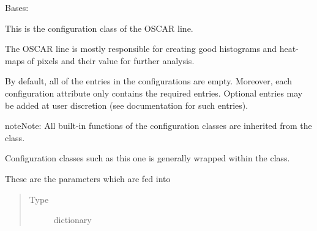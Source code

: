 \documentclass[letterpaper,10pt,english]{sphinxmanual}
\begin{document}
\begin{fulllineitems}
\label{\detokenize{python_docstrings/IfA_Smeargle.yankee.configuration_classes.OscarConfig_file:IfA_Smeargle.yankee.configuration_classes.OscarConfig_file.OscarConfig}}
Bases: {\hyperref[\detokenize{python_docstrings/IfA_Smeargle.yankee.configuration_classes.BaseConfig_file:IfA_Smeargle.yankee.configuration_classes.BaseConfig_file.BaseConfig}]{}}

This is the configuration class of the OSCAR line.

The OSCAR line is mostly responsible for creating good histograms and
heat-maps of pixels and their value for further analysis.

By default, all of the entries in the configurations are empty. Moreover,
each configuration attribute only contains the required entries. Optional
entries may be added at user discretion (see documentation for such
entries).

\begin{sphinxadmonition}{note}{Note:}
All built-in functions of the configuration classes are inherited from the
{\hyperref[\detokenize{python_docstrings/IfA_Smeargle.yankee.configuration_classes.BaseConfig_file:IfA_Smeargle.yankee.configuration_classes.BaseConfig_file.BaseConfig}]{}}
class.

Configuration classes such as this one is generally wrapped within the
{\hyperref[\detokenize{python_docstrings/IfA_Smeargle.yankee.yankee_main:IfA_Smeargle.yankee.yankee_main.SmeargleConfig}]{}} class.
\end{sphinxadmonition}

\begin{fulllineitems}
\label{\detokenize{python_docstrings/IfA_Smeargle.yankee.configuration_classes.OscarConfig_file:IfA_Smeargle.yankee.configuration_classes.OscarConfig_file.OscarConfig.heatmap_config}}
These are the parameters which are fed into
\begin{quote}\begin{description}
\item[{Type}] \leavevmode
dictionary


\end{description}
\end{quote}
\end{fulllineitems}
\end{fulllineitems}
\end{document}
